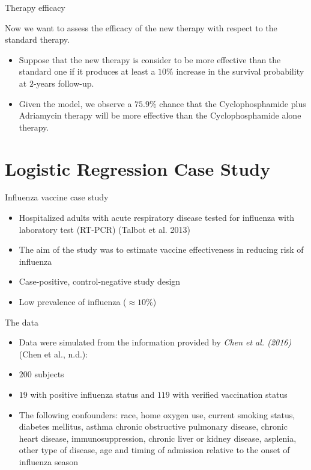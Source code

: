 \documentclass[ignorenonframetext,a4paper]{beamer}
\begin{document}
\begin{frame}{Therapy efficacy}

Now we want to assess the efficacy of the new therapy with respect to
the standard therapy.

\begin{itemize}
\item
  Suppose that the new therapy is consider to be more effective than the
  standard one if it produces at least a \(10 \%\) increase in the
  survival probability at \(2\)-years follow-up.
\item
  Given the model, we observe a \(75.9 \%\) chance that the
  Cyclophosphamide plus Adriamycin therapy will be more effective than
  the Cyclophosphamide alone therapy.
\end{itemize}

\end{frame}

\section{Logistic Regression Case
Study}\label{logistic-regression-case-study}

\begin{frame}{Influenza vaccine case study}

\begin{itemize}
\item
  Hospitalized adults with acute respiratory disease tested for
  influenza with laboratory test (RT-PCR) (Talbot et al. 2013)
\item
  The aim of the study was to estimate vaccine effectiveness in reducing
  risk of influenza
\item
  Case-positive, control-negative study design
\item
  Low prevalence of influenza (\(\approx 10 \%\))
\end{itemize}

\end{frame}

\begin{frame}{The data}

\begin{itemize}
\item
  Data were simulated from the information provided by \emph{Chen et al.
  (2016)} (Chen et al., n.d.):
\item
  \(200\) subjects
\item
  \(19\) with positive influenza status and \(119\) with verified
  vaccination status
\item
  The following confounders: race, home oxygen use, current smoking
  status, diabetes mellitus, asthma chronic obstructive pulmonary
  disease, chronic heart disease, immunosuppression, chronic liver or
  kidney disease, asplenia, other type of disease, age and timing of
  admission relative to the onset of influenza season
\end{itemize}

\end{frame}
\end{document}

